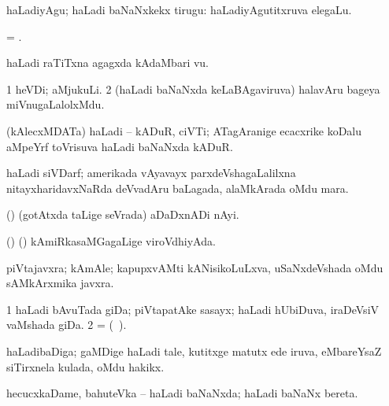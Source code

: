 \noindent
\gl{\akirx} 
\bmng
haLadiyAgu; haLadi baNaNxkekx tirugu:  haLadiyAgutitxruva elegaLu.
\emng
\eentry

\bentry
{}
\gl{\nA} 
\bmng
= .
\emng
\eentry

\bentry
{} 
\gl{\nA} 
\bmng
haLadi raTiTxna agagxda kAdaMbari \mo vu.
\emng
\eentry

\bentry
{} 
\gl{\nA} 
\bmng
\bnum
\num{1} heVDi; aMjukuLi. 
\num{2} (haLadi baNaNxda keLaBAgaviruva) halavAru bageya miVnugaLalolxMdu.
\enum
\emng 
\eentry

\bentry
{}
\gl{\nA} 
\bmng
(kAlecxMDATa) haLadi -- kADuR, ciVTi; ATagAranige ecacxrike koDalu aMpeYrf toVrisuva haLadi baNaNxda kADuR.
\emng
\eentry

\bentry
{}
\gl{\nA} 
\bmng
haLadi siVDarf; amerikada vAyavayx parxdeVshagaLalilxna nitayxharidavxNaRda deVvadAru baLagada, alaMkArada oMdu mara.
\emng
\eentry

\bentry
{} 
\gl{\nA} 
\bmng
(\ame)
(gotAtxda taLige seVrada) aDaDxnADi nAyi.
\emng
\eentry

\bentry
{} 
\gl{\gu} 
\bmng
(\ame) (\rUpa) 
kAmiRkasaMGagaLige viroVdhiyAda.
\emng
\eentry

\bentry
{}
\gl{\nA} 
\bmng
piVtajavxra; kAmAle; kapupxvAMti kANisikoLuLxva,  uSaNxdeVshada oMdu  sAMkArxmika javxra.
\emng
\eentry

\bentry
{}
\gl{\nA} 
\bmng
\bnum
\num{1} haLadi bAvuTada giDa; piVtapatAke sasayx; haLadi hUbiDuva, iraDeVsiV vaMshada giDa. 
\num{2} =  (\pagu\ ).
\enum
\emng
\eentry

\bentry
{} 
\gl{\nA} 
\bmng
haLadibaDiga; gaMDige haLadi tale, kutitxge matutx ede iruva, eMbareYsaZ siTirxnela kulada, oMdu hakikx.
\emng 
\eentry

\bentry
{} 
\gl{\gu} 
\bmng
hecucxkaDame, bahuteVka -- haLadi baNaNxda; haLadi baNaNx bereta.
\emng
\eentry

